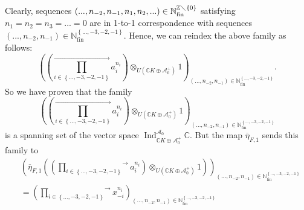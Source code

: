 \documentclass[etingof-lie.tex]{subfiles}
\begin{document}
Clearly, sequences $\left(  ...,n_{-2},n_{-1},n_{1},n_{2},...\right)
\in\mathbb{N}_{\operatorname*{fin}}^{\mathbb{Z}\diagdown\left\{  0\right\}  }$
satisfying $n_{1}=n_{2}=n_{3}=...=0$ are in 1-to-1 correspondence with
sequences $\left(  ...,n_{-2},n_{-1}\right)  \in\mathbb{N}%
_{\operatorname*{fin}}^{\left\{  ...,-3,-2,-1\right\}  }$. Hence, we can
reindex the above family as follows:
\[
\left(  \left(  \overset{\rightarrow}{\prod\limits_{i\in\left\{
...,-3,-2,-1\right\}  }}a_{i}^{n_{i}}\right)  \otimes_{U\left(  \mathbb{C}%
K\oplus\mathcal{A}_{0}^{+}\right)  }1\right)  _{\left(  ...,n_{-2}%
,n_{-1}\right)  \in\mathbb{N}_{\operatorname*{fin}}^{\left\{
...,-3,-2,-1\right\}  }}.
\]
So we have proven that the family%
\[
\left(  \left(  \overset{\rightarrow}{\prod\limits_{i\in\left\{
...,-3,-2,-1\right\}  }}a_{i}^{n_{i}}\right)  \otimes_{U\left(  \mathbb{C}%
K\oplus\mathcal{A}_{0}^{+}\right)  }1\right)  _{\left(  ...,n_{-2}%
,n_{-1}\right)  \in\mathbb{N}_{\operatorname*{fin}}^{\left\{
...,-3,-2,-1\right\}  }}%
\]
is a spanning set of the vector space $\operatorname*{Ind}%
\nolimits_{\mathbb{C}K\oplus\mathcal{A}_{0}^{+}}^{\mathcal{A}_{0}}\mathbb{C}$.
But the map $\overline{\eta}_{F,1}$ sends this family to%
\begin{align*}
&  \left(  \overline{\eta}_{F,1}\left(  \left(  \overset{\rightarrow
}{\prod\limits_{i\in\left\{  ...,-3,-2,-1\right\}  }}a_{i}^{n_{i}}\right)
\otimes_{U\left(  \mathbb{C}K\oplus\mathcal{A}_{0}^{+}\right)  }1\right)
\right)  _{\left(  ...,n_{-2},n_{-1}\right)  \in\mathbb{N}%
_{\operatorname*{fin}}^{\left\{  ...,-3,-2,-1\right\}  }}\\
&  =\left(  \overset{\rightarrow}{\prod\limits_{i\in\left\{
...,-3,-2,-1\right\}  }}x_{-i}^{n_{i}}\right)  _{\left(  ...,n_{-2}%
,n_{-1}\right)  \in\mathbb{N}_{\operatorname*{fin}}^{\left\{
...,-3,-2,-1\right\}  }}%
\end{align*}
\end{document}
